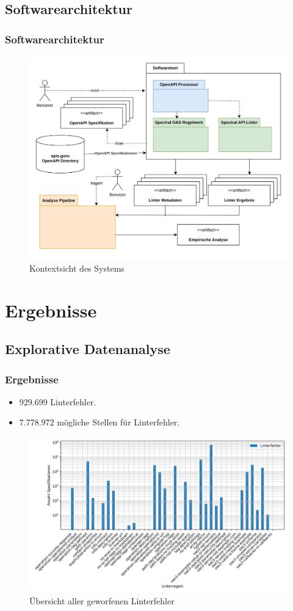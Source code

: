 \subsection{Softwarearchitektur}
\begin{frame}
  \frametitle{Softwarearchitektur}
  \vspace{-0.5cm}
  \begin{figure}[htbp]
    \centering
    \includegraphics[width=0.8\linewidth]{img/defense-contextview.png}
    \caption{Kontextsicht des Systems}
    \label{fig:Kontextsicht}
  \end{figure}
\end{frame}

\section{Ergebnisse}
\subsection{Explorative Datenanalyse}
\begin{frame}
  \frametitle{Ergebnisse}
  \vspace{-0.4cm}
  \begin{itemize}
    \item 929.699 Linterfehler.
    \item 7.778.972 mögliche Stellen für Linterfehler.
  \end{itemize}
  \begin{figure}[htbp]
    \centering
    \includegraphics[width=0.9\linewidth]{img/defense-totalspecthrownbarplot.png}
    \caption{Übersicht aller geworfenen Linterfehler}
    \label{fig:totalthrown}
  \end{figure}
\end{frame}

